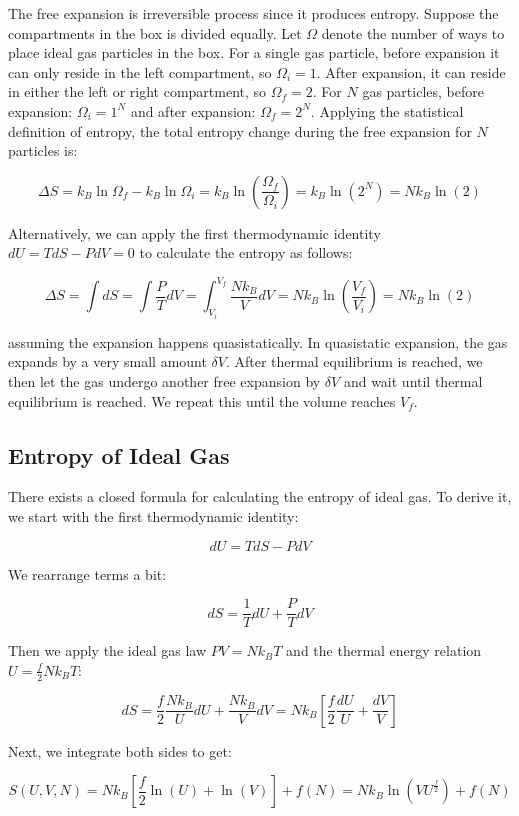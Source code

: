 The free expansion is irreversible process since it produces entropy. Suppose the compartments in the box is divided equally. Let $\Omega$ denote the number of ways to place ideal gas particles in the box. For a single gas particle, before expansion it can only reside in the left compartment, so $\Omega_i=1$. After expansion, it can reside in either the left or right compartment, so $\Omega_f=2$. For $N$ gas particles, before expansion: $\Omega_i=1^N$ and after expansion: $\Omega_f=2^N$. Applying the statistical definition of entropy, the total entropy change during the free expansion for $N$ particles is:

\[\Delta S=k_B\ln\Omega_f-k_B\ln\Omega_i=k_B\ln\left(\frac{\Omega_f}{\Omega_i}\right)=k_B\ln(2^N)=Nk_B\ln(2)\]

Alternatively, we can apply the first thermodynamic identity $dU=TdS-PdV=0$ to calculate the entropy as follows:

\[\Delta S=\int dS=\int \frac{P}{T} dV=\int_{V_i}^{V_f} \frac{Nk_B}{V} dV=Nk_B\ln\left(\frac{V_f}{V_i}\right)=Nk_B\ln(2)\]

assuming the expansion happens quasistatically. In quasistatic expansion, the gas expands by a very small amount $\delta V$. After thermal equilibrium is reached, we then let the gas undergo another free expansion by $\delta V$ and wait until thermal equilibrium is reached. We repeat this until the volume reaches $V_f$.

\subsection{Entropy of Ideal Gas}

There exists a closed formula for calculating the entropy of ideal gas. To derive it, we start with the first thermodynamic identity:

\[dU=TdS-PdV\]

We rearrange terms a bit:

\[dS=\frac{1}{T}dU+\frac{P}{T}dV\]

Then we apply the ideal gas law $PV=Nk_BT$ and the thermal energy relation $U=\frac{f}{2} Nk_BT$:

\[dS=\frac{f}{2}\frac{Nk_B}{U}dU+\frac{Nk_B}{V}dV=Nk_B\left[ \frac{f}{2}\frac{dU}{U}+\frac{dV}{V} \right]\]

Next, we integrate both sides to get:

\[S(U,V,N)=Nk_B\left[ \frac{f}{2}\ln(U)+\ln(V) \right]+f(N)=Nk_B\ln\left(VU^\frac{f}{2}\right)+f(N)\]

